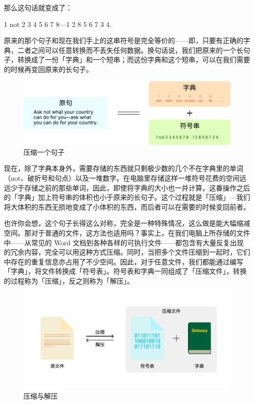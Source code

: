 那么这句话就变成了：

\begin{quoting}
  1 not 2 3 4 5 6 7 8—1 2 8 5 6 7 3 4.
\end{quoting}

原来的那个句子和现在我们手上的这串符号是完全等价的——即，只要有正确的字典，二者之间可以任意转换而不丢失任何数据。换句话说，我们把原来的一个长句子，转换成了一份「字典」和一个短串；而这份字典和这个短串，可以在我们需要的时候再变回原来的长句子。

\begin{figure}[htb!]
  \centering
  \includegraphics[width=.8\textwidth]{assets/software/Compress_a_sentence.pdf}
  \caption{压缩一个句子}
  \label{fig:Compress_a_sentence}
\end{figure}

现在，除了字典本身外，需要存储的东西就只剩极少数的几个不在字典里的单词（not、破折号和句点）以及一堆数字。在电脑里存储这样一堆符号花费的空间远远少于存储之前的那些单词，因此，即使将字典的大小也一并计算，这番操作之后的「字典」加上符号串的体积也小于原来的长句子。这个过程就是「压缩」—我们将大体积的东西无损地变成了小体积的东西，而后者可以在需要的时候变回前者。

也许你会想，这个句子长得这么对称，完全是一种特殊情况，这么做是能大幅缩减空间。那对于普通的文件，这方法也适用吗？事实上，在我们电脑上所存储的文件中——从常见的 Word 文档到各种各样的可执行文件——都包含有大量反复出现的冗余内容，完全可以用这种方式压缩。同时，当把多个文件压缩到一起时，它们中存在的重复信息亦占用了不少空间。因此，对于任意文件，我们都能通过编写「字典」，将文件转换成「符号表」。符号表和字典一同组成了「压缩文件」，转换的过程称为「压缩」，反之则称为「解压」。

\begin{figure}[htb!]
  \centering
  \includegraphics[width=.7\textwidth]{assets/software/Compress_and_Extract.pdf}
  \caption{压缩与解压}
  \label{fig:Compress_and_Extract}
\end{figure}

